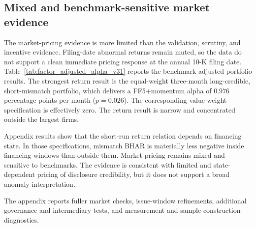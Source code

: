 

\FloatBarrier

\subsection{Mixed and benchmark-sensitive market evidence}

The market-pricing evidence is more limited than the validation, scrutiny, and incentive evidence. Filing-date abnormal returns remain muted, so the data do not support a clean immediate pricing response at the annual 10-K filing date. Table~\ref{tab:factor_adjusted_alpha_v31} reports the benchmark-adjusted portfolio results. The strongest return result is the equal-weight three-month long-credible, short-mismatch portfolio, which delivers a FF5+momentum alpha of $0.976$ percentage points per month ($p=0.026$). The corresponding value-weight specification is effectively zero. The return result is narrow and concentrated outside the largest firms.

Appendix results show that the short-run return relation depends on financing state. In those specifications, mismatch BHAR is materially less negative inside financing windows than outside them. Market pricing remains mixed and sensitive to benchmarks. The evidence is consistent with limited and state-dependent pricing of disclosure credibility, but it does not support a broad anomaly interpretation.



\FloatBarrier

The appendix reports fuller market checks, issue-window refinements, additional governance and intermediary tests, and measurement and sample-construction diagnostics.
